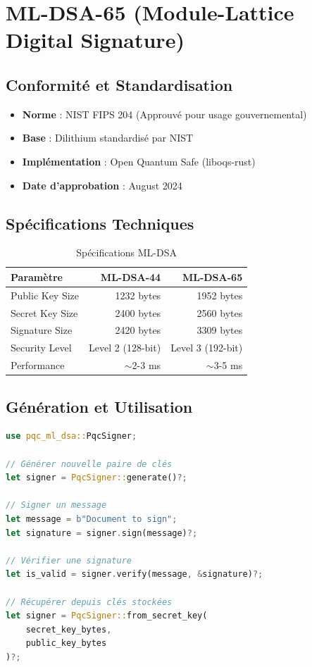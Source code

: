 \documentclass[12pt,a4paper]{report}
\begin{document}
\section{ML-DSA-65 (Module-Lattice Digital Signature)}

\subsection{Conformité et Standardisation}

\begin{itemize}
  \item \textbf{Norme} : NIST FIPS 204 (Approuvé pour usage gouvernemental)
  \item \textbf{Base} : Dilithium standardisé par NIST
  \item \textbf{Implémentation} : Open Quantum Safe (liboqs-rust)
  \item \textbf{Date d'approbation} : August 2024
\end{itemize}

\subsection{Spécifications Techniques}

\begin{table}[H]
\centering
\begin{tabular}{|l|r|r|}
\hline
\textbf{Paramètre} & \textbf{ML-DSA-44} & \textbf{ML-DSA-65} \\
\hline
Public Key Size & 1232 bytes & 1952 bytes \\
\hline
Secret Key Size & 2400 bytes & 2560 bytes \\
\hline
Signature Size & 2420 bytes & 3309 bytes \\
\hline
Security Level & Level 2 (128-bit) & Level 3 (192-bit) \\
\hline
Performance & $\sim$2-3 ms & $\sim$3-5 ms \\
\hline
\end{tabular}
\caption{Spécifications ML-DSA}
\end{table}

\subsection{Génération et Utilisation}

\begin{lstlisting}[language=Rust]
use pqc_ml_dsa::PqcSigner;

// Générer nouvelle paire de clés
let signer = PqcSigner::generate()?;

// Signer un message
let message = b"Document to sign";
let signature = signer.sign(message)?;

// Vérifier une signature
let is_valid = signer.verify(message, &signature)?;

// Récupérer depuis clés stockées
let signer = PqcSigner::from_secret_key(
    secret_key_bytes,
    public_key_bytes
)?;
\end{lstlisting}
\end{document}
